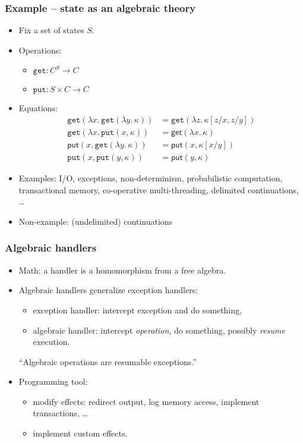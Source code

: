 \documentclass[11pt,aspectratio=169,fleqn]{beamer}
\newcommand{\xlam}[1]{\lambda #1.\,}
\begin{document}
\begin{frame}
  \frametitle{Example -- state as an algebraic theory}

  \begin{itemize}
  \item Fix a set of states $S$.
  \item Operations:
    \begin{itemize}
    \item $\mathtt{get} : C^S \to C$
    \item $\mathtt{put} : S \times C \to C$
    \end{itemize}
  \item \pause
    Equations:
    \begin{align*}
      \mathtt{get}(\xlam{x} \mathtt{get}(\xlam{y} \kappa)) &=
      \mathtt{get}(\xlam{z} \kappa[z/x, z/y])
      \\
      \mathtt{get}(\xlam{x} \mathtt{put}(x, \kappa)) &=
      \mathsf{get}(\xlam{x} \kappa)
      \\
      \mathsf{put}(x, \mathtt{get}(\xlam{y} \kappa)) &=
      \mathsf{put}(x, \kappa[x/y])
      \\
      \mathtt{put}(x, \mathtt{put}(y, \kappa)) &=
      \mathsf{put}(y, \kappa)
    \end{align*}
  \item \pause
    Examples: I/O, exceptions, non-determinism, probabilistic computation, transactional memory,
    co-operative multi-threading, delimited continuations, \dots
  \item Non-example: (undelimited) continuations
  \end{itemize}
\end{frame}

\begin{frame}
  \frametitle{Algebraic handlers}

  \begin{itemize}
  \item Math: a handler is a homomorphism from a free algebra.
  \item \pause
    Algebraic handlers generalize exception handlers:
    \begin{itemize}
    \item exception handler: intercept exception and do something,
    \item algebraic handler: intercept \emph{operation}, do something, possibly \emph{resume} execution.
    \end{itemize}
    ``Algebraic operations are resumable exceptions.''
  \item \pause
    Programming tool:
    \begin{itemize}
    \item modify effects: redirect output, log memory access, implement transactions, \ldots
    \item implement custom effects.
    \end{itemize}
  \end{itemize}
\end{frame}
\end{document}
